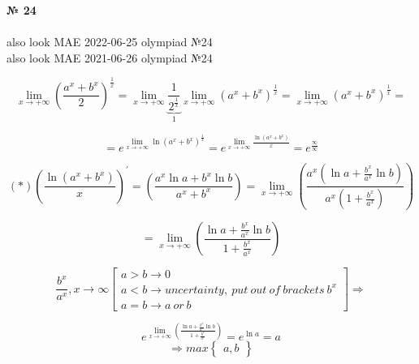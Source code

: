 \documentclass{article}
\begin{document}
\textbf{№ 24}
\\
\\ also look MAE 2022-06-25 olympiad №24 
\\ also look MAE 2021-06-26 olympiad №24

$$ \lim_{x\to+\infty} \left( {\frac{a^x+b^x}{2}}\right)^{\frac{1}{x}} 
= \lim_{x\to+\infty} \underbrace{\frac{1}{2^\frac{1}{x}}}_{1} \lim_{x\to+\infty}\left( {a^x+b^x}\right)^{\frac{1}{x}} 
= \lim_{x\to+\infty}\left( {a^x+b^x}\right)^{\frac{1}{x}}
= $$

\Large
$$ = e^{\lim\limits_{x \to+\infty}\ln\left( {a^x+b^x}\right)^{\frac{1}{x}}} 
= e^{\lim\limits_{x \to+\infty} \frac{\ln\left( {a^x+b^x}\right)}{x}} 
= e^{\frac{\infty}{\infty}} $$

$$ (*) \left(\frac{\ln\left( {a^x+b^x}\right)}{x}\right)^\prime 
=  \left( \frac{a^x\ln{a}+b^x\ln{b}}{a^x+b^x} \right) 
= \lim\limits_{x \to+\infty} \left( \frac{a^x(\ln{a}+\frac{b^x}{a^x}\ln{b})}{a^x(1+\frac{b^x}{a^x})} \right) $$

$$ = \lim\limits_{x \to+\infty} \left( \frac{\ln{a}+\frac{b^x}{a^x}\ln{b}}{1+\frac{b^x}{a^x}} \right) $$

$$ \frac{b^x}{a^x}, x\to\infty
\left[
\begin{array}{lll}
a>b \rightarrow 0 \\
a<b \rightarrow uncertainty, \ put \ out \ of \ brackets \ b^x \\
a=b \rightarrow a \ or \ b
\end{array}
\right] 
\Rightarrow$$

$$
e^{ \lim\limits_{x \to+\infty} \left( \frac{\ln{a}+\frac{b^x}{a^x}\ln{b}}{1+\frac{b^x}{a^x}} \right)}
= e^{\ln{a}}
= a $$
$$ \Rightarrow max\left\{
  \begin{array}{ccc} 
  a, b 
  \end{array}
\right\} $$
\end{document}
